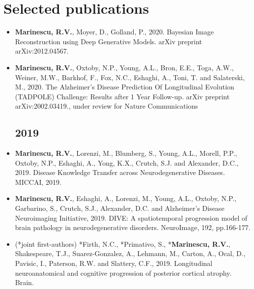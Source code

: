 \documentclass[a4paper,10pt]{article} %
\begin{document}
\section*{Selected publications}

\newcommand{\poster}{\textcolor{red}{Poster}}
\newcommand{\talk}{\textcolor{green!60!black}{Talk}}
\newcommand{\journal}{\textcolor{blue}{Journal}}


\begin{itemize}
\subsection*{2020}
\item[\talk] \textbf{Marinescu, R.V.}, Moyer, D., Golland, P., 2020. Bayesian Image Reconstruction using Deep Generative Models. arXiv preprint arXiv:2012.04567.
\item[\journal] \textbf{Marinescu, R.V.}, Oxtoby, N.P., Young, A.L., Bron, E.E., Toga, A.W., Weiner, M.W., Barkhof, F., Fox, N.C., Eshaghi, A., Toni, T. and Salaterski, M., 2020. The Alzheimer's Disease Prediction Of Longitudinal Evolution (TADPOLE) Challenge: Results after 1 Year Follow-up. arXiv preprint arXiv:2002.03419., under review for Nature Communications

\subsection*{2019}
\item[\poster] \textbf{Marinescu, R.V.}, Lorenzi, M., Blumberg, S., Young, A.L., Morell, P.P., Oxtoby, N.P., Eshaghi, A., Yong, K.X., Crutch, S.J. and Alexander, D.C., 2019. Disease Knowledge Transfer across Neurodegenerative Diseases. MICCAI, 2019.

\item[\journal] \textbf{Marinescu, R.V.}, Eshaghi, A., Lorenzi, M., Young, A.L., Oxtoby, N.P., Garbarino, S., Crutch, S.J., Alexander, D.C. and Alzheimer's Disease Neuroimaging Initiative, 2019. DIVE: A spatiotemporal progression model of brain pathology in neurodegenerative disorders. NeuroImage, 192, pp.166-177.

\item[\journal] (*joint first-authors) *Firth, N.C., *Primativo, S., *\textbf{Marinescu, R.V.}, Shakespeare, T.J., Suarez-Gonzalez, A., Lehmann, M., Carton, A., Ocal, D., Pavisic, I., Paterson, R.W. and Slattery, C.F., 2019. Longitudinal neuroanatomical and cognitive progression of posterior cortical atrophy. Brain.


\end{itemize}
\end{document}
